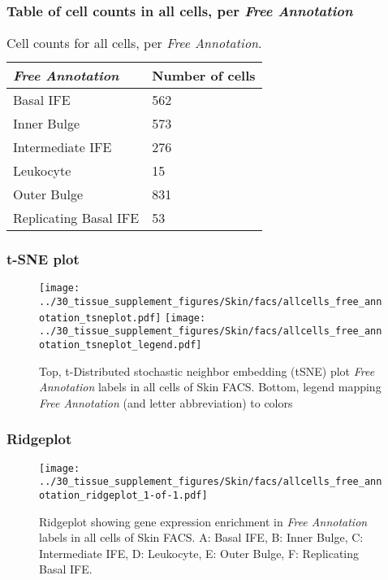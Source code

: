 \subsubsection{Table of cell counts in all cells, per \emph{Free Annotation}}\begin{table}[h]
\centering
\label{my-label}
\begin{tabular}{@{}ll@{}}
\toprule

\emph{Free Annotation}& Number of cells \\ \midrule
Basal IFE & 562 \\

Inner Bulge & 573 \\

Intermediate IFE & 276 \\

Leukocyte & 15 \\

Outer Bulge & 831 \\

Replicating Basal IFE & 53 \\
\bottomrule
\end{tabular}
\caption{Cell counts for all cells, per \emph{Free Annotation}.}
\end{table}

\clearpage
\subsubsection{t-SNE plot}
\begin{figure}[h]
\centering
\texttt{[image: ../30\_tissue\_supplement\_figures/Skin/facs/allcells\_free\_annotation\_tsneplot.pdf]}
\texttt{[image: ../30\_tissue\_supplement\_figures/Skin/facs/allcells\_free\_annotation\_tsneplot\_legend.pdf]}
\caption{Top, t-Distributed stochastic neighbor embedding (tSNE) plot  \emph{Free Annotation} labels in all cells of Skin FACS. Bottom, legend mapping \emph{Free Annotation} (and letter abbreviation) to colors}
\end{figure}


\clearpage

\subsubsection{Ridgeplot}
\begin{figure}[h]
\centering
\texttt{[image: ../30\_tissue\_supplement\_figures/Skin/facs/allcells\_free\_annotation\_ridgeplot\_1-of-1.pdf]}

\caption{ Ridgeplot  showing gene expression enrichment in \emph{Free Annotation} labels in all cells of Skin FACS. A: Basal IFE, B: Inner Bulge, C: Intermediate IFE, D: Leukocyte, E: Outer Bulge, F: Replicating Basal IFE.}
\end{figure}


